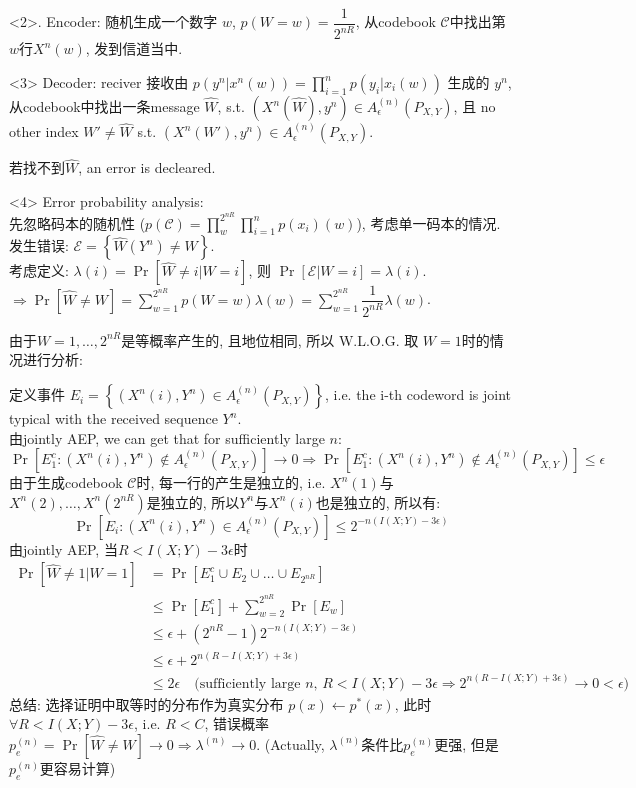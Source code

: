 <2>. Encoder: 随机生成一个数字 $w$, $p(W=w)=\dfrac{1}{2^{nR}}$, 从codebook $\mathcal{C}$中找出第$w$行$X^n(w)$, 发到信道当中.

<3> Decoder: reciver 接收由 $p(y^n|x^n(w))=\prod\limits_{i=1}^np(y_i|x_i(w))$ 生成的 $y^n$, 从codebook中找出一条message $\hat{W}$, s.t. $(X^n(\hat{W}), y^n)\in A_{\epsilon}^{(n)}(P_{X,Y})$, 且 no other index $W'\neq \hat{W}$ s.t. $(X^n(W'), y^n)\in A_{\epsilon}^{(n)}(P_{X,Y})$.

若找不到$\hat{W}$, an error is decleared.

<4> Error probability analysis: \\
先忽略码本的随机性 ($p(\mathcal{C})=\prod\limits_{w}^{2^{nR}}\prod\limits_{i=1}^np(x_i)(w)$), 考虑单一码本的情况. \\
发生错误: $\mathcal{E}=\left\{\hat{W}(Y^n) \neq W\right\}$. \\
考虑定义: $\lambda(i)=\Pr\left[\hat{W}\neq i|W=i\right]$, 则 $\Pr\left[\mathcal{E}|W=i\right]=\lambda(i)$. \\
$\Rightarrow \Pr\left[\hat{W}\neq W\right]=\sum\limits_{w=1}^{2^{nR}}p(W=w)\lambda(w)=\sum\limits_{w=1}^{2^{nR}}\dfrac{1}{2^{nR}}\lambda(w)$.

由于$W=1,\ldots,2^{nR}$是等概率产生的, 且地位相同, 所以 W.L.O.G. 取 $W=1$时的情况进行分析:

定义事件 $E_i=\left\{\left(X^{n}(i),Y^n\right)\in A_{\epsilon}^{(n)}(P_{X,Y})\right\}$, i.e. the i-th codeword is joint typical with the received sequence $Y^n$. \\
由jointly AEP, we can get that for sufficiently large $n$:
$$\Pr\left[E_1^c:\left(X^{n}(i),Y^n\right)\not\in A_{\epsilon}^{(n)}(P_{X,Y}) \right]\to 0 \Rightarrow \Pr\left[E_1^c: \left(X^{n}(i),Y^n\right)\not\in A_{\epsilon}^{(n)}(P_{X,Y})\right]\leq \epsilon$$
由于生成codebook $\mathcal{C}$时, 每一行的产生是独立的, i.e. $X^n(1)$与$X^n(2),\ldots,X^n(2^{nR})$是独立的, 所以$Y^n$与$X^n(i)$也是独立的, 所以有:
$$\Pr\left[E_i:\left(X^{n}(i),Y^n\right)\in A_{\epsilon}^{(n)}(P_{X,Y}) \right]\leq 2^{-n\left(I(X;Y)-3\epsilon\right)}$$
由jointly AEP, 当$R<I(X;Y)-3\epsilon$时
\begin{align*}
\Pr\left[\hat{W}\neq 1|W=1\right] &= \Pr\left[E_1^c\cup E_2\cup\ldots\cup E_{2^{nR}}\right] \\
&\leq \Pr\left[E_1^c\right] + \sum\limits_{w=2}^{2^{nR}}\Pr\left[E_w\right] \\
&\leq \epsilon + (2^{nR}-1) 2^{-n\left(I(X;Y)-3\epsilon\right)} \\
&\leq \epsilon + 2^{n\left(R-I(X;Y)+3\epsilon\right)} \\
&\leq 2\epsilon \quad \text{(sufficiently large $n$, $R<I(X;Y)-3\epsilon\Rightarrow 2^{n\left(R-I(X;Y)+3\epsilon\right)}\to 0<\epsilon$)}
\end{align*}
总结: 选择证明中取等时的分布作为真实分布 $p(x)\gets p^*(x)$, 此时$\forall R<I(X;Y)-3\epsilon$, i.e. $R<C$, 错误概率$p_e^{(n)}=\Pr\left[\hat{W}\neq W\right]\to 0\Rightarrow \lambda^{(n)}\to 0$. (Actually, $\lambda^{(n)}$条件比$p_e^{(n)}$更强, 但是$p_e^{(n)}$更容易计算)

